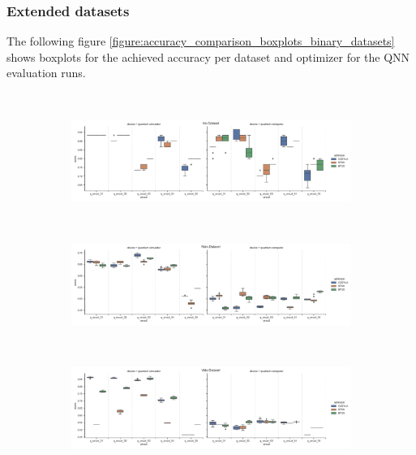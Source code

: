 \clearpage

\subsubsection{Extended datasets}
\label{subsubsection:extended_datasets_boxplots}
The following figure \ref{figure:accuracy_comparison_boxplots_binary_datasets} shows boxplots for the achieved accuracy per dataset and optimizer for the QNN evaluation runs.

\begin{figure}[!ht]
    \centering
    \\[-3ex]
    \begin{subfigure}{1.0\textwidth}
        \centering
        \includegraphics[width=1.0\linewidth]{thesis/Figures/qnn/boxplots/1000_iris.png} 
        \label{subfigure:accuracy_comparison_boxplots_iris_extended_dataset}
    \end{subfigure}
    \\[-3ex]
    \begin{subfigure}{1.0\textwidth}
        \centering
        \includegraphics[width=1.0\linewidth]{thesis/Figures/qnn/boxplots/1000_rain.png} 
        \label{subfigure:accuracy_comparison_boxplots_rain_extended_dataset}
    \end{subfigure}
    \\[-3ex]
    \begin{subfigure}{1.0\textwidth}
        \centering
        \includegraphics[width=1.0\linewidth]{thesis/Figures/qnn/boxplots/1000_vlds.png} 

\end{subfigure}
\end{figure}

